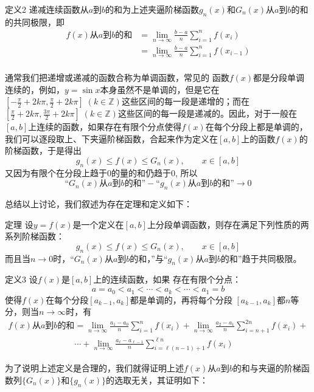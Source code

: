 \begin{blk}
    {定义2} 递减连续函数从$a$到$b$的和为上述夹逼阶梯函数$g_n(x)$和$G_n(x)$从$a$到$b$的和的共同极限，即  
\[\begin{split}
    f(x)\text{从$a$到$b$的和}&=\lim_{n\to\infty} \frac{b-a}{n}\sum^n_{i=1}f(x_i)\\
    &=\lim_{n\to\infty} \frac{b-a}{n}\sum^n_{i=1}f(x_{i-1})\\
\end{split}\]
\end{blk}

通常我们把递增或递减的函数合称为单调函数，常见的
函数$f(x)$都是分段单调连续的，例如，$y=\sin x$本身虽然不是单调的，但是它在$\left[-\frac{\pi}{2}+2k\pi,\frac{\pi}{2}+2k\pi\right]\; (k\in\mathbb{Z})$这些区间的每一段是递增的；而在$\left[\frac{\pi}{2}+2k\pi,\frac{3\pi}{2}+2k\pi\right]\; (k\in\mathbb{Z})$这些区间的每一段是递减的。因此，对于一般在$[a,b]$上连续的函数，如果存在有限个分点使得$f(x)$在每个分段上都是单调的，我们可以逐段取上、下夹逼阶梯函数，合起来作为定义在$[a,b]$上的函数$f(x)$的阶梯函数，于是得出
\[g_n (x)\le f(x)\le G_n(x),\qquad x\in [a,b]\]
又因为有限个在分段上趋于0的量的和仍趋于0, 所以
\[\text{“$G_n(x)$从$a$到$b$的和”}-\text{“$g_n(x)$从$a$到$b$的和”}\to 0\]

总结以上讨论，我们叙述为存在定理和定义如下：

\begin{blk}
    {定理} 设$y=f(x)$是一个定义在$[a,b]$上分段单调函数，则存在满足下列性质的两系列阶梯函数：
    \[g_n(x)\le f(x)\le G_n(x),\qquad x\in[a,b]\]
而且当$n\to 0$时，“$G_n(x)$从$a$到$b$的和，”与“$g_n(x)$从$a$到$b$的和”趋于共同极限。
\end{blk}


\begin{blk}
    {定义3} 设$f(x)$是$[a,b]$上的连续函数，如果 存在有限个分点：
\[a=a_0<a_1<\cdots<a_k<\cdots<a_1=b\]
使得$f(x)$在每个分段$[a_{k-1},a_k]$都是单调的，再将每个分段
    $[a_{k-1},a_k]$都$n$等分，则当$n\to\infty$时，有
\[\begin{split}
f(x)\text{从$a$到$b$的和}&=\lim_{n\to\infty}\frac{a_1-a_0}{n}\sum^n_{i=1}f(x_i)+\lim_{n\to\infty}\frac{a_2-a_1}{n}\sum^{2n}_{i=n+1}f(x_i)+\\
&\cdots +\lim_{n\to\infty}\frac{a_\ell-a_{\ell-1}}{n}\sum^{\ell n}_{i=\ell(n-1)+1}f(x_i)
\end{split}\]
\end{blk}

为了说明上述定义是合理的，我们就得证明上述$f(x)$从$a$到$b$的和与夹逼的阶梯函数列$\{G_n(x)\}$和$\{g_n(x)\}$的选取无关，其证明如下：

